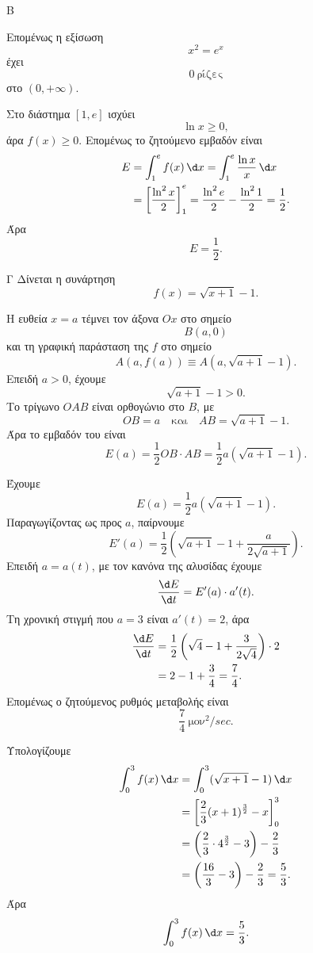 \begin{thema}{Β}
\begin{erwthma}
Επομένως η εξίσωση
\[
x^2=e^x
\]
έχει
\[
{0\ \text{ρίζες}}
\]
στο $(0,+\infty)$.

\item Στο διάστημα $[1,e]$ ισχύει
\[
\ln x\geq0,
\]
άρα $f(x)\geq0$. Επομένως το ζητούμενο εμβαδόν είναι
\begin{align*}
E&=\dint_1^e f(x)\,\d x
=\dint_1^e\frac{\ln x}{x}\,\d x\\
&=\left[\frac{\ln^2x}{2}\right]_1^e
=\frac{\ln^2e}{2}-\frac{\ln^21}{2}
=\frac{1}{2}.
\end{align*}
Άρα
\[
{E=\frac{1}{2}}.
\]
\end{erwthma}
\end{thema}

\begin{thema}{Γ}
Δίνεται η συνάρτηση
\[
f(x)=\sqrt{x+1}-1.
\]
\begin{erwthma}
\item Η ευθεία $x=a$ τέμνει τον άξονα $Ox$ στο σημείο
\[
B(a,0)
\]
και τη γραφική παράσταση της $f$ στο σημείο
\[
A(a,f(a))\equiv A(a,\sqrt{a+1}-1).
\]
Επειδή $a>0$, έχουμε
\[
\sqrt{a+1}-1>0.
\]
Το τρίγωνο $OAB$ είναι ορθογώνιο στο $B$, με
\[
OB=a
\quad\text{και}\quad
AB=\sqrt{a+1}-1.
\]
Άρα το εμβαδόν του είναι
\[
E(a)=\frac{1}{2}OB\cdot AB
=\frac{1}{2}a(\sqrt{a+1}-1).
\]

\item Έχουμε
\[
E(a)=\frac{1}{2}a(\sqrt{a+1}-1).
\]
Παραγωγίζοντας ως προς $a$, παίρνουμε
\[
E'(a)=\frac{1}{2}\left(\sqrt{a+1}-1+\frac{a}{2\sqrt{a+1}}\right).
\]
Επειδή $a=a(t)$, με τον κανόνα της αλυσίδας έχουμε
\[
\frac{\d E}{\d t}=E'(a)\cdot a'(t).
\]
Τη χρονική στιγμή που $a=3$ είναι $a'(t)=2$, άρα
\begin{align*}
\frac{\d E}{\d t}
&=\frac{1}{2}\left(\sqrt{4}-1+\frac{3}{2\sqrt4}\right)\cdot2\\
&=2-1+\frac{3}{4}
=\frac{7}{4}.
\end{align*}
Επομένως ο ζητούμενος ρυθμός μεταβολής είναι
\[
{\frac{7}{4}\ \text{μον}^2/\si{sec}}.
\]

\item Υπολογίζουμε
\begin{align*}
\dint_0^3 f(x)\,\d x
&=\dint_0^3(\sqrt{x+1}-1)\,\d x\\
&=\left[\frac{2}{3}(x+1)^{\frac{3}{2}}-x\right]_0^3\\
&=\left(\frac{2}{3}\cdot4^{\frac{3}{2}}-3\right)-\frac{2}{3}\\
&=\left(\frac{16}{3}-3\right)-\frac{2}{3}
=\frac{5}{3}.
\end{align*}
Άρα
\[
{\dint_0^3 f(x)\,\d x=\frac{5}{3}}.
\]


\end{erwthma}
\end{thema}
